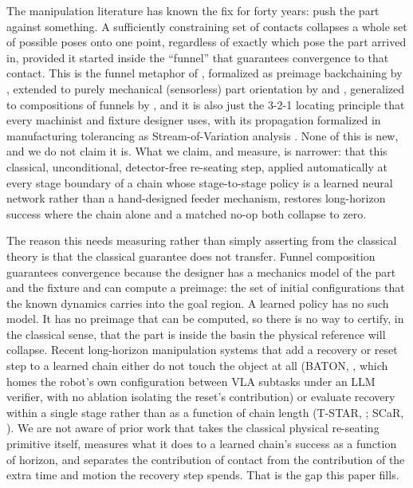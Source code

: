 \documentclass[11pt]{article}
\begin{document}
The manipulation literature has known the fix for forty years: push the part
against something. A sufficiently constraining set of contacts collapses a
whole set of possible poses onto one point, regardless of exactly which pose
the part arrived in, provided it started inside the ``funnel'' that
guarantees convergence to that contact. This is the funnel metaphor of
\citet{mason1985}, formalized as preimage backchaining by
\citet{lozanoperez1984}, extended to purely mechanical (sensorless) part
orientation by \citet{erdmann1988} and \citet{goldberg1993}, generalized to
compositions of funnels by \citet{burridge1999}, and it is also just the
3-2-1 locating principle that every machinist and fixture designer uses, with
its propagation formalized in manufacturing tolerancing as
Stream-of-Variation analysis \citep{jinshi1999,shi2006}. None of this is
new, and we do not claim it is. What we claim, and measure, is narrower:
that this classical, unconditional, detector-free re-seating step, applied
automatically at every stage boundary of a chain whose stage-to-stage policy
is a learned neural network rather than a hand-designed feeder mechanism,
restores long-horizon success where the chain alone and a matched no-op both
collapse to zero.

The reason this needs measuring rather than simply asserting from the
classical theory is that the classical guarantee does not transfer. Funnel
composition guarantees convergence because the designer has a mechanics
model of the part and the fixture and can compute a preimage: the set of
initial configurations that the known dynamics carries into the goal region.
A learned policy has no such model. It has no preimage that can be computed,
so there is no way to certify, in the classical sense, that the part is
inside the basin the physical reference will collapse. Recent long-horizon
manipulation systems that add a recovery or reset step to a learned chain
either do not touch the object at all (BATON, \citet{baton2026}, which
homes the robot's own configuration between VLA subtasks under an LLM
verifier, with no ablation isolating the reset's contribution) or evaluate
recovery within a single stage rather than as a function of chain length
(T-STAR, \citet{lee2021}; SCaR, \citet{scar2024}). We are not aware of prior
work that takes the classical physical re-seating primitive itself,
measures what it does to a learned chain's success as a function of horizon,
and separates the contribution of contact from the contribution of the extra
time and motion the recovery step spends. That is the gap this paper fills.
\end{document}
